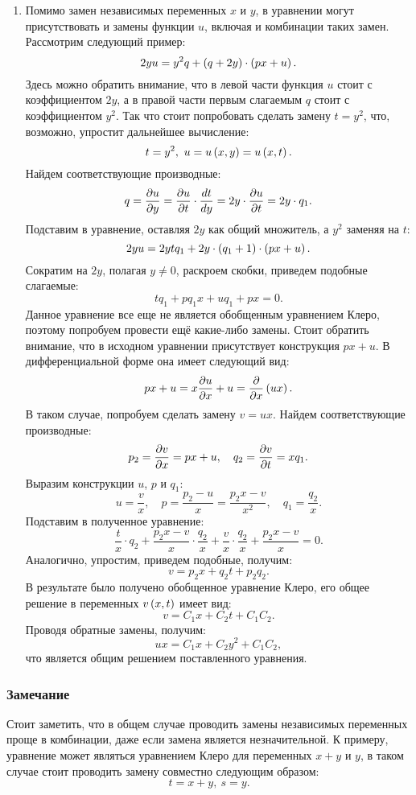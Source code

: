 \begin{enumerate}
			\item Помимо замен независимых переменных $x$ и $y$, в уравнении могут присутствовать и замены функции $u$, включая и комбинации таких замен. Рассмотрим следующий пример:
				\[ 2y u = y^2 q + \left( q + 2y \right) \cdot \left( p x + u \right). \]
				Здесь можно обратить внимание, что в левой части функция $u$ стоит с коэффициентом $2y$, а в правой части первым слагаемым $q$ стоит с коэффициентом $y^2$. Так что стоит попробовать сделать замену $t = y^2$, что, возможно, упростит дальнейшее вычисление:
				\[ t = y^2, ~ u = u \left( x, y \right) = u \left( x, t \right). \]
				Найдем соответствующие производные:
				\[ q = \dfrac{\partial u}{\partial y} = \dfrac{\partial u}{\partial t} \cdot \dfrac{d t}{d y} = 2y \cdot \dfrac{\partial u}{\partial t} = 2y \cdot q_1. \]
				Подставим в уравнение, оставляя $2y$ как общий множитель, а $y^2$ заменяя на $t$:
				\[ 2y u = 2y t q_1 + 2y \cdot \left( q_1 + 1 \right) \cdot \left( px + u \right). \]
				Сократим на $2y$, полагая $y \neq 0$, раскроем скобки, приведем подобные слагаемые:
				\[ t q_1 + p q_1 x + u q_1 + px = 0. \]
				Данное уравнение все еще не является обобщенным уравнением Клеро, поэтому попробуем провести ещё какие-либо замены. Стоит обратить внимание, что в исходном уравнении присутствует конструкция $px + u$. В дифференциальной форме она имеет следующий вид:
				\[ px + u = x \dfrac{\partial u}{\partial x} + u = \dfrac{\partial }{\partial x} \left( ux \right). \]
				В таком случае, попробуем сделать замену $v = ux$. Найдем соответствующие производные:
				\[ p_2 = \dfrac{\partial v}{\partial x} = px + u, \quad q_2 = \dfrac{\partial v}{\partial t} = x q_1. \]
				Выразим конструкции $u$, $p$ и $q_1$:
				\[ u = \frac{v}{x}, \quad p = \frac{p_2 - u}{x} = \frac{p_2x - v}{x^2}, \quad q_1 = \frac{q_2}{x}. \]
				Подставим в полученное уравнение:
				\[ \frac{t}{x} \cdot q_2 + \frac{p_2x - v}{x} \cdot \frac{q_2}{x} + \frac{v}{x} \cdot \frac{q_2}{x} + \frac{p_2x - v}{x} = 0. \]
				Аналогично, упростим, приведем подобные, получим:
				\[ v = p_2 x + q_2 t + p_2 q_2. \]
				В результате было получено обобщенное уравнение Клеро, его общее решение в переменных $v \left( x, t \right)$ имеет вид:
				\[ v = C_1 x + C_2 t + C_1 C_2. \]
				Проводя обратные замены, получим:
				\[ ux = C_1 x + C_2 y^2 + C_1 C_2, \]
				что является общим решением поставленного уравнения.

		\end{enumerate}

		\vspace{20pt}
		\subsubsection*{Замечание}
			Стоит заметить, что в общем случае проводить замены независимых переменных проще в комбинации, даже если замена является незначительной. К примеру, уравнение может являться уравнением Клеро для переменных $x + y$ и $y$, в таком случае стоит проводить замену совместно следующим образом: 
			\[ t = x + y, ~ s = y. \]

